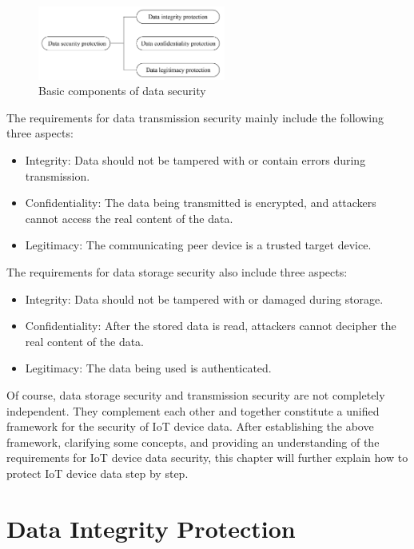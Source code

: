 \documentclass[a4paper,12pt,openany]{book}
\begin{document}
\begin{figure}[!h]
    \centering
    \includegraphics[width=0.55\textwidth]{D13Z/13-2}
    \caption{Basic components of data security}
\end{figure}

The requirements for data transmission security mainly include the following three aspects:

\begin{itemize}[noitemsep]
    \item Integrity: Data should not be tampered with or contain errors during transmission.
    \item Confidentiality: The data being transmitted is encrypted, and attackers cannot access the real content of the data.
    \item Legitimacy: The communicating peer device is a trusted target device.
\end{itemize}

The requirements for data storage security also include three aspects:

\begin{itemize}[noitemsep]
    \item Integrity: Data should not be tampered with or damaged during storage.
    \item Confidentiality: After the stored data is read, attackers cannot decipher the real content of the data.
    \item Legitimacy: The data being used is authenticated.
\end{itemize}

Of course, data storage security and transmission security are not completely independent. They complement each other and together constitute a unified framework for the security of IoT device data. After establishing the above framework, clarifying some concepts, and providing an understanding of the requirements for IoT device data security, this chapter will further explain how to protect IoT device data step by step.

\section{Data Integrity Protection}
\end{document}

